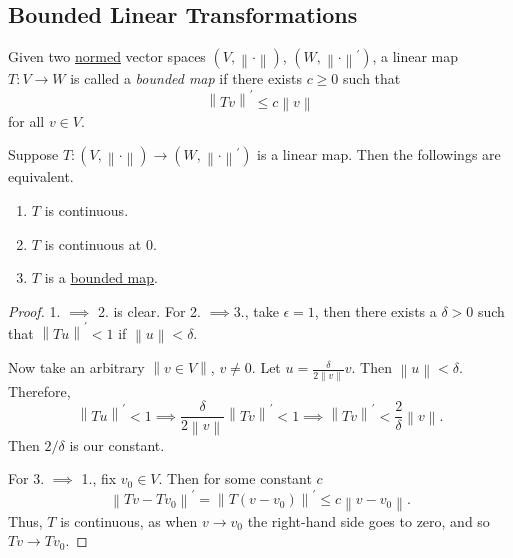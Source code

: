 \subsection{Bounded Linear Transformations}
\begin{definition}\label{def:bounded-linear-transformation}
	Given two \hyperref[def:norm]{normed} vector spaces \((V,\left\lVert \cdot\right\rVert )\), \((W,\left\lVert \cdot\right\rVert^\prime )\),
	a linear map \(T \colon V \to W\) is called a \emph{bounded map} if there exists \(c \geq 0\) such that
	\[
		\left\lVert Tv\right\rVert^\prime \leq c\left\lVert v\right\rVert
	\]
	for all \(v \in V\).
\end{definition}

\begin{proposition}
	Suppose \(T \colon (V, \left\lVert \cdot\right\rVert) \to (W, \left\lVert \cdot\right\rVert^\prime )\) is a linear map. Then the followings are equivalent.
	\begin{enumerate}
		\item \(T\) is continuous.
		\item \(T\) is continuous at \(0\).
		\item \(T\) is a \hyperref[def:bounded-linear-transformation]{bounded map}.
	\end{enumerate}
\end{proposition}
\begin{proof}
	1. \(\implies\) 2. is clear. For 2. \(\implies\)3., take \(\epsilon = 1\), then there exists a \(\delta > 0\) such that \(\left\lVert Tu\right\rVert^\prime < 1\)
	if \(\left\lVert u\right\rVert < \delta\).

	Now take an arbitrary \(\left\lVert v \in V\right\rVert\), \(v \neq 0\). Let \(u = \frac{\delta}{2\left\lVert v\right\rVert}v\). Then \(\left\lVert u\right\rVert < \delta\).
	Therefore,
	\[
		\left\lVert Tu\right\rVert ^\prime <1 \implies \frac{\delta }{2\left\lVert v\right\rVert }\left\lVert Tv\right\rVert ^\prime < 1\implies \left\lVert Tv\right\rVert ^\prime < \frac{2}{\delta }\left\lVert v\right\rVert .
	\]
	Then \(2/\delta\) is our constant.

	For 3. \(\implies\) 1., fix \(v_0 \in V\). Then for some constant \(c\)
	\[
		\left\lVert Tv - Tv_0\right\rVert^\prime = \left\lVert T(v - v_0)\right\rVert ^\prime \leq c\left\lVert v - v_0\right\rVert.
	\]
	Thus, \(T\) is continuous, as when \(v \to v_0\) the right-hand side goes to zero, and so \(Tv \to Tv_0\).
\end{proof}

